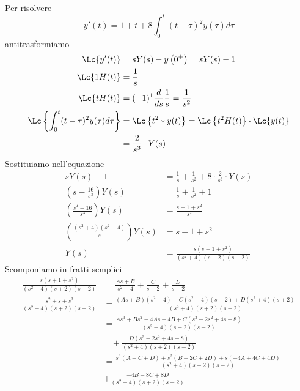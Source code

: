 \Soluzione

Per risolvere
\begin{equation*}
y'(t) = 1 + t + 8\int^{t}_{0}(t - \tau)^{2} y(\tau) d\tau
\end{equation*}
antitrasformiamo
\begin{align*}
\Lc\{y'(t)\} & = sY(s) - y\left(0^{+}\right) = sY(s) - 1\\
\Lc\{1H(t)\} & = \frac{1}{s}\\
\Lc\{tH(t)\} & = (- 1)^{1}\frac{d}{ds}\frac{1}{s} = \frac{1}{s^{2}}\\
\Lc\left\{\int^{t}_{0}(t - \tau)^{2} y(\tau) d\tau \right\} & = \Lc\left\{t^{2} *y(t)\right\} = \Lc\left\{t^{2} H(t)\right\} \cdot \Lc\{y(t)\}\\
 & = \frac{2}{s^{3}} \cdot Y(s)
\end{align*}
Sostituiamo nell'equazione
\begin{align*}
sY(s) - 1 & = \frac{1}{s} + \frac{1}{s^{2}} + 8 \cdot \frac{2}{s^{3}} \cdot Y(s)\\
\left(s - \frac{16}{s^{3}}\right) Y(s) & = \frac{1}{s} + \frac{1}{s^{2}} + 1\\
\left(\frac{s^{4} - 16}{s^{3}}\right) Y(s) & = \frac{s + 1 + s^{2}}{s^{2}}\\
\left(\frac{\left(s^{2} + 4\right)\left(s^{2} - 4\right)}{s}\right) Y(s) & = s + 1 + s^{2}\\
Y(s) & = \frac{s\left(s + 1 + s^{2}\right)}{\left(s^{2} + 4\right)(s + 2)(s - 2)}
\end{align*}
Scomponiamo in fratti semplici
\begin{align*}
\frac{s\left(s + 1 + s^{2}\right)}{\left(s^{2} + 4\right)(s + 2)(s - 2)} & = \frac{As + B}{s^{2} + 4} + \frac{C}{s + 2} + \frac{D}{s - 2}\\
\frac{s^{2} + s + s^{3}}{\left(s^{2} + 4\right)(s + 2)(s - 2)} & = \frac{(As + B)\left(s^{2} - 4\right) + C\left(s^{2} + 4\right)(s - 2) + D\left(s^{2} + 4\right)(s + 2)}{\left(s^{2} + 4\right)(s + 2)(s - 2)}\\
 & = \frac{As^{3} + Bs^{2} - 4As - 4B + C\left(s^{3} - 2s^{2} + 4s - 8\right)}{\left(s^{2} + 4\right)(s + 2)(s - 2)}\\
 & \ \ \ \ + \frac{D\left(s^{3} + 2s^{2} + 4s + 8\right)}{\left(s^{2} + 4\right)(s + 2)(s - 2)}\\
 & = \frac{s^{3}(A + C + D) + s^{2}(B - 2C + 2D) + s(- 4A + 4C + 4D)}{\left(s^{2} + 4\right)(s + 2)(s - 2)}\\
 & + \frac{- 4B - 8C + 8D}{\left(s^{2} + 4\right)(s + 2)(s - 2)}
\end{align*}
